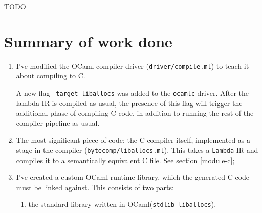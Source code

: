 \documentclass[12pt,a4paper,twoside,openright]{report}
\begin{document}
TODO

\section{Summary of work done}

\begin{enumerate}
  \item I've modified the OCaml compiler driver (\lstinline!driver/compile.ml!) to teach it about compiling to C.

    A new flag \lstinline!-target-liballocs! was added to the \lstinline!ocamlc! driver. After the
    lambda IR is compiled as usual, the presence of this flag will
    trigger the additional phase of compiling C code, in addition
    to running the rest of the compiler pipeline as usual.
  \item The most significant piece of code: the C compiler itself, implemented
      as a stage in the compiler (\lstinline!bytecomp/liballocs.ml!). This
      takes a \lstinline!Lambda! IR and compiles it to a semantically
      equivalent C file. See section \ref{module-c};
  \item I've created a custom OCaml runtime library, which the generated C
      code must be linked against. This consists of two parts:
    \begin{enumerate}
      \item the standard library written in OCaml(\lstinline!stdlib_liballocs!).


\end{enumerate}
\end{enumerate}
\end{document}
